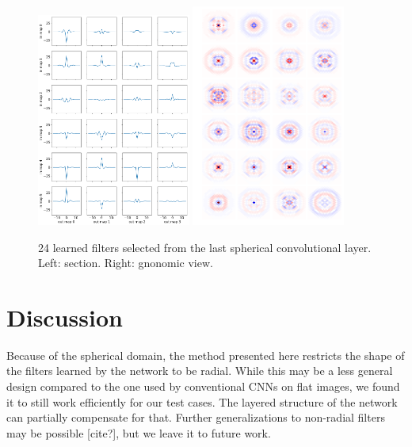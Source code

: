 \documentclass[final,twocolumn,3p,times,authoryear]{elsarticle}
\newcommand{\1}{\b{1}}              %
\newcommand{\0}{\b{0}}              %
\begin{document}
\begin{figure}[!ht]
\centering
\includegraphics[width=0.45\textwidth]{figures/section_filter_last.pdf} 
\includegraphics[width=0.45\textwidth]{figures/gnonomic_filter_last.pdf}
\caption{24 learned filters selected from the last spherical convolutional layer. Left: section. Right: gnonomic view.}
\label{fig:learned_filter}
\end{figure}

\section{Discussion}

Because of the spherical domain, the method presented here restricts the shape of the filters learned by the network to be radial.
While this may be a less general design compared to the one used by conventional CNNs on flat images, we found it to still work efficiently for our test cases.
The layered structure of the network can partially compensate for that.
Further generalizations to non-radial filters may be possible [cite?], but we leave it to future work.
\end{document}
